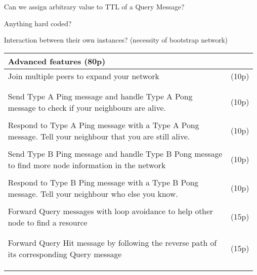 \documentclass[12pt, a4paper]{article}
\begin{document}
\noindent
Can we assign arbitrary value to TTL of a Query Message?

\noindent
Anything hard coded?

\noindent
Interaction between their own instances? (necessity of bootstrap network)

\begin{center}
\begin{tabular}{|p{6cm}|p{10cm}|}
\multicolumn{2}{l}{Advanced features (80p)}\\
\hline
Join multiple peers to expand your network & (10p)\\
&\\
&\\
\hline
Send Type A Ping message and handle Type A Pong message to check if your neighbours are alive. & (10p)\\
&\\
\hline
Respond to Type A Ping message with a Type A Pong message.
Tell your neighbour that you are still alive. & (10p)\\
&\\
\hline
Send Type B Ping message and handle Type B Pong message to find more node information in the network & (10p) \\
&\\
\hline
Respond to Type B Ping message with a Type B Pong message.
Tell your neighbour who else you know. & (10p) \\
&\\
\hline
Forward Query messages with loop avoidance to help other node to find a resource & (15p) \\
&\\
&\\
\hline
Forward Query Hit message by following the reverse path of its corresponding Query message & (15p)\\
&\\
&\\
&\\
\hline
\end{tabular}
\end{center}
\end{document}
